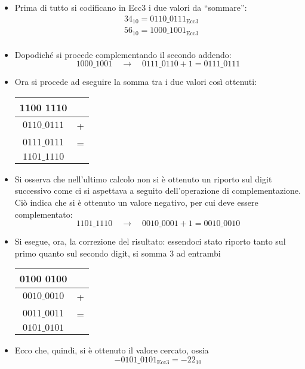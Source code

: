 \documentclass[a4paper]{extarticle}
\newcommand{\quotes}[1]{``#1''}
\renewcommand\arraystretch{}
\begin{document}
\begin{itemize}
    \item Prima di tutto si codificano in Ecc3 i due valori da \quotes{sommare}:
    \begin{align*}
        &34_{10} = 0110\_0111_{\text{Ecc3}}\\
        &56_{10} = 1000\_1001_{\text{Ecc3}}\\
    \end{align*}

    \item Dopodiché si procede complementando il secondo addendo:
    \[1000\_1001 \hspace{1em} \rightarrow \hspace{1em} 0111\_0110 + 1 = 0111\_0111\]

    \item Ora si procede ad eseguire la somma tra i due valori così ottenuti:
    \noindent
    \begin{table}[H]
    \setlength{\tabcolsep}{4pt}
    \renewcommand{\arraystretch}{1.2}
    \centering
    \begin{tabular}{cc}
        1100 1110 &\\
        \hline
        $0110\_0111$ & +\\
        $0111\_0111$ & =\\
        \hline
        $1101\_1110$
    \end{tabular}
    \end{table}

    \item Si osserva che nell'ultimo calcolo non si è ottenuto un riporto sul digit successivo come ci si aspettava a seguito dell'operazione di complementazione. Ciò indica che si è ottenuto un valore negativo, per cui deve essere complementato:
    \[1101\_1110 \hspace{1em} \rightarrow \hspace{1em} 0010\_0001 + 1 = 0010\_0010\]

    \item Si esegue, ora, la correzione del risultato: essendoci stato riporto tanto sul primo quanto sul secondo digit, si somma $3$ ad entrambi
    
    \noindent
    \begin{table}[H]
    \setlength{\tabcolsep}{4pt}
    \renewcommand{\arraystretch}{1.2}
    \centering
    \begin{tabular}{cc}
        0100 0100 &\\
        \hline
        $0010\_0010$ & +\\
        $0011\_0011$ & =\\
        \hline
        $0101\_0101$
    \end{tabular}
    \end{table}

    \item Ecco che, quindi, si è ottenuto il valore cercato, ossia
    \[- 0101\_0101_{\text{Ecc}3} = -22_{10}\]
\end{itemize}
\end{document}
